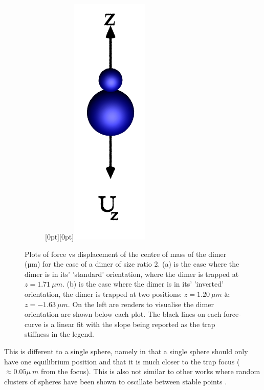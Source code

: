 \begin{figure}[h!]
\begin{subfigure}{.65\linewidth}
		\caption{}
		\label{lam=2_inverted}
	\end{subfigure}\hfill %
	\begin{subfigure}{.25\linewidth}
		\centering
		\raisebox{40pt}[0pt][0pt]{\makebox{}\includegraphics[width=0.3\linewidth, keepaspectratio]{theta=180.png}}
		\label{small_over_large}
	\end{subfigure}
	\caption{Plots of force vs displacement of the 
		centre of mass of the dimer (µm) for the 
		case of a dimer of size ratio 2. (a) is the 
		case where the dimer is in its' 'standard' 
		orientation, where the dimer is trapped at 
		$z = 1.71\ \mu m$. (b) is the case where the 
		dimer is in its' 'inverted' orientation, the 
		dimer is trapped at two positions: $z = 1.20\ 
		\mu m$ \& $z=-1.63\ \mu m$. On the left are 
		renders to visualise the dimer orientation 
		are shown below each plot. The black lines 
		on each force-curve is a linear fit with the 
		slope being reported as the trap stiffness in 
		the legend.}
	\label{fig:paradigmatic}
\end{figure}

This is different to a single sphere, namely in that a
single sphere should only have one equilibrium position
and that it is much closer to the trap focus ($\approx
0.05\mu\ m$ from the focus). This is also not similar 
to other works where random clusters of spheres have 
been shown to oscillate between stable points 
\cite{Vigilante2020}.

